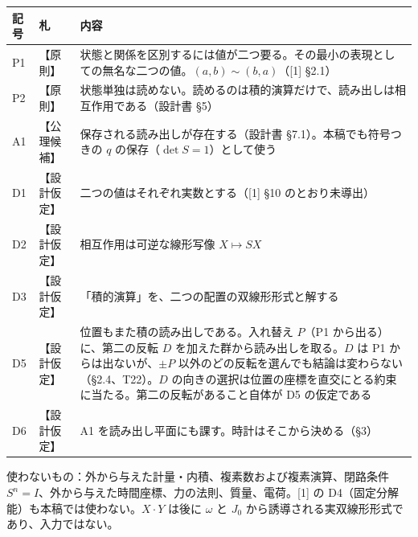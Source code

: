 \documentclass[
  a4paper,
]{ltjsarticle}
\newcounter{none} %
\begin{document}
{\def\LTcaptype{none} %
\begin{longtable}[]{@{}
  >{\raggedright\arraybackslash}p{}
  >{\raggedright\arraybackslash}p{}
  >{\raggedright\arraybackslash}p{}@{}}
\toprule\noalign{}
\begin{minipage}[b]{\linewidth}\raggedright
記号
\end{minipage} & \begin{minipage}[b]{\linewidth}\raggedright
札
\end{minipage} & \begin{minipage}[b]{\linewidth}\raggedright
内容
\end{minipage} \\
\midrule\noalign{}
\endhead
\bottomrule\noalign{}
\endlastfoot
P1 & 【原則】 &
状態と関係を区別するには値が二つ要る。その最小の表現としての無名な二つの値。\((a,b)\sim(b,a)\)（{[}1{]}
§2.1） \\
P2 & 【原則】 &
状態単独は読めない。読めるのは積的演算だけで、読み出しは相互作用である（設計書
§5） \\
A1 & 【公理候補】 & 保存される読み出しが存在する（設計書
§7.1）。本稿でも符号つきの \(q\) の保存（\(\det S=1\)）として使う \\
D1 & 【設計仮定】 & 二つの値はそれぞれ実数とする（{[}1{]} §10
のとおり未導出） \\
D2 & 【設計仮定】 & 相互作用は可逆な線形写像 \(X\mapsto SX\) \\
D3 & 【設計仮定】 & 「積的演算」を、二つの配置の双線形形式と解する \\
D5 & 【設計仮定】 & 位置もまた積の読み出しである。入れ替え \(P\)（P1
から出る）に、第二の反転 \(D\) を加えた群から読み出しを取る。\(D\) は P1
からは出ないが、\(\pm P\)
以外のどの反転を選んでも結論は変わらない（§2.4、T22）。\(D\)
の向きの選択は位置の座標を直交にとる約束に当たる。第二の反転があること自体が
D5 の仮定である \\
D6 & 【設計仮定】 & A1
を読み出し平面にも課す。時計はそこから決める（§3） \\
\end{longtable}
}

使わないもの：外から与えた計量・内積、複素数および複素演算、閉路条件
\(S^n=I\)、外から与えた時間座標、力の法則、質量、電荷。{[}1{]} の
D4（固定分解能）も本稿では使わない。\(X\cdot Y\) は後に \(\omega\) と
\(J_0\) から誘導される実双線形形式であり、入力ではない。
\end{document}
